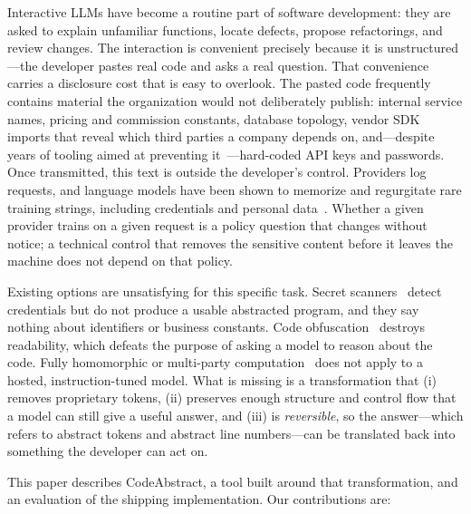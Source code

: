 \documentclass[conference]{IEEEtran}
\begin{document}
Interactive LLMs have become a routine part of software development: they
are asked to explain unfamiliar functions, locate defects, propose
refactorings, and review changes. The interaction is convenient precisely
because it is unstructured---the developer pastes real code and asks a
real question. That convenience carries a disclosure cost that is easy to
overlook. The pasted code frequently contains material the organization
would not deliberately publish: internal service names, pricing and
commission constants, database topology, vendor SDK imports that reveal
which third parties a company depends on, and---despite years of tooling
aimed at preventing it~\cite{meli2019git,sinha2015detecting,gitleaks,trufflehog}---hard-coded
API keys and passwords. Once transmitted, this text is outside the
developer's control. Providers log requests, and language models have been
shown to memorize and regurgitate rare training strings, including
credentials and personal data~\cite{carlini2021extracting,carlini2023quantifying,yang2024memorization,lukas2023analyzing}.
Whether a given provider trains on a given request is a policy question
that changes without notice; a technical control that removes the
sensitive content before it leaves the machine does not depend on that
policy.

Existing options are unsatisfying for this specific task. Secret
scanners~\cite{gitleaks,trufflehog} detect credentials but do not produce
a usable abstracted program, and they say nothing about identifiers or
business constants. Code obfuscation~\cite{collberg1997taxonomy} destroys
readability, which defeats the purpose of asking a model to reason about
the code. Fully homomorphic or multi-party
computation~\cite{yao1982protocols} does not apply to a hosted,
instruction-tuned model. What is missing is a transformation that (i)
removes proprietary tokens, (ii) preserves enough structure and control
flow that a model can still give a useful answer, and (iii) is
\emph{reversible}, so the answer---which refers to abstract tokens and
abstract line numbers---can be translated back into something the
developer can act on.

This paper describes CodeAbstract, a tool built around that
transformation, and an evaluation of the shipping implementation. Our
contributions are:
\end{document}
